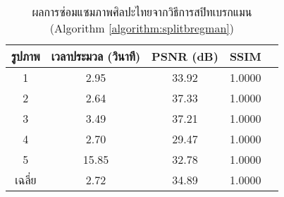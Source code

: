 \begin{table}[H]
    \centering
    \begin{tabular}[ht]{|c|c|c|c|c|}
        \hline
        รูปภาพ &เวลาประมวล  (วินาที) & PSNR (dB) & SSIM \\
        \hline
        1 & 2.95 & 33.92 & 1.0000 \\ 
        2 & 2.64 & 37.33 & 1.0000 \\
        3 &  3.49 & 37.21 & 1.0000 \\
        4 & 2.70  & 29.47  & 1.0000 \\
        5 & 15.85  & 32.78  & 1.0000 \\
        \hline
        เฉลี่ย & 2.72  & 34.89  & 1.0000 \\
        \hline
    \end{tabular}
    \caption{ผลการซ่อมแซมภาพศิลปะไทยจากวิธีการสปิทเบรกแมน (Algorithm \ref{algorithm:splitbregman})}
    \label{table:ex4-splitbregman}
\end{table}